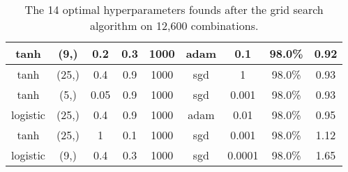 \begin{table}[]
\begin{tabular}{|c|c|c|c|c|c|c|c|c|}
tanh                & (9,)                                                                           & 0.2                                                                  & 0.3               & 1000                                                                    & adam            & 0.1                & 98.0\%                                                               & 0.92                                                                                 \\ \hline
tanh                & (25,)                                                                          & 0.4                                                                  & 0.9               & 1000                                                                    & sgd             & 1                  & 98.0\%                                                               & 0.93                                                                                 \\ \hline
tanh                & (5,)                                                                           & 0.05                                                                 & 0.9               & 1000                                                                    & sgd             & 0.001              & 98.0\%                                                               & 0.93                                                                                 \\ \hline
logistic            & (25,)                                                                          & 0.4                                                                  & 0.9               & 1000                                                                    & adam            & 0.01               & 98.0\%                                                               & 0.95                                                                                 \\ \hline
tanh                & (25,)                                                                          & 1                                                                    & 0.1               & 1000                                                                    & sgd             & 0.001              & 98.0\%                                                               & 1.12                                                                                 \\ \hline
logistic            & (9,)                                                                           & 0.4                                                                  & 0.3               & 1000                                                                    & sgd             & 0.0001             & 98.0\%                                                               & 1.65                                                                                 \\ \hline
\end{tabular}
\caption{The 14 optimal hyperparameters founds after the grid search algorithm on 12,600 combinations.}
\label{tab:optimal-hyperparameters}
\end{table}